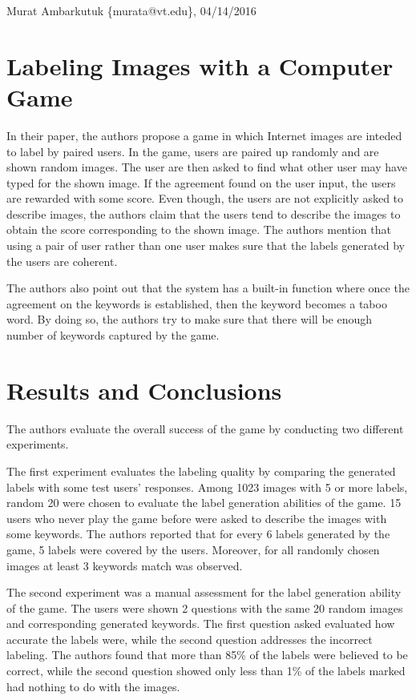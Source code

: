 \documentclass[11pt]{article}
\begin{document}
\thispagestyle{empty}
\begin{flushright}
	\small{Murat Ambarkutuk \{murata@vt.edu\}, 04/14/2016}
\end{flushright}
\section*{Labeling Images with a Computer Game}
In their paper, the authors propose a game in which Internet images are inteded to label by paired users.
In the game, users are paired up randomly and are shown random images.
The user are then asked to find what other user may have typed for the shown image.
If the agreement found on the user input, the users are rewarded with some score.
Even though, the users are not explicitly asked to describe images, the authors claim that the users tend to describe the images to obtain the score corresponding to the shown image.
The authors mention that using a pair of user rather than one user makes sure that the labels generated by the users are coherent.

The authors also point out that the system has a built-in function where once the agreement on the keywords is established, then the keyword becomes a taboo word.
By doing so, the authors try to make sure that there will be enough number of keywords captured by the game.
\section*{Results and Conclusions}
The authors evaluate the overall success of the game by conducting two different experiments.

The first experiment evaluates the labeling quality by comparing the generated labels with some test users' responses.
Among 1023 images with 5 or more labels, random 20 were chosen to evaluate the label generation abilities of the game.
15 users who never play the game before were asked to describe the images with some keywords.
The authors reported that for every 6 labels generated by the game, 5 labels were covered by the users.
Moreover, for all randomly chosen images at least 3 keywords match was observed.

The second experiment was a manual assessment for the label generation ability of the game.
The users were shown 2 questions with the same 20 random images and corresponding generated keywords.
The first question asked evaluated how accurate the labels were, while the second question addresses the incorrect labeling.
The authors found that more than 85\% of the labels were believed to be correct, while the second question showed only less than 1\% of the labels marked had nothing to do with the images.
\end{document}
